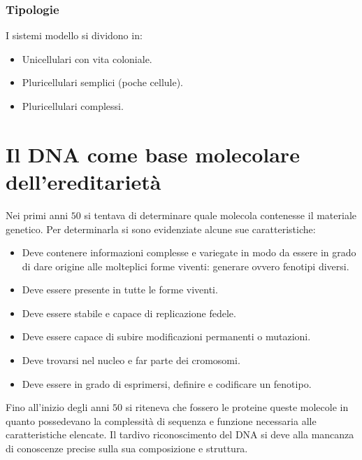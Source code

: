 		\subsubsection{Tipologie}
		I sistemi modello si dividono in:
		\begin{multicols}{2}
			\begin{itemize}
				\item Unicellulari con vita coloniale.
				\item Pluricellulari semplici (poche cellule).
				\item Pluricellulari complessi. 
			\end{itemize}
		\end{multicols}

\section{Il DNA come base molecolare dell'ereditariet\`a}
Nei primi anni $50$ si tentava di determinare quale molecola contenesse il materiale genetico. 
Per determinarla si sono evidenziate alcune sue caratteristiche:
\begin{multicols}{2}
	\begin{itemize}
		\item Deve contenere informazioni complesse e variegate in modo da essere in grado di dare origine alle molteplici forme viventi: generare ovvero fenotipi diversi. 	
		\item Deve essere presente in tutte le forme viventi.
		\item Deve essere stabile e capace di replicazione fedele. 	
		\item Deve essere capace di subire modificazioni permanenti o mutazioni.
		\item Deve trovarsi nel nucleo e far parte dei cromosomi.
		\item Deve essere in grado di esprimersi, definire e codificare un fenotipo. 
	\end{itemize}
\end{multicols}
Fino all'inizio degli anni $50$ si riteneva che fossero le proteine queste molecole in quanto possedevano la complessit\`a di sequenza e funzione necessaria alle caratteristiche elencate. 
Il tardivo riconoscimento del DNA si deve alla mancanza di conoscenze precise sulla sua composizione e struttura. 

